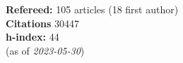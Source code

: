 \textbf{Refereed:} 105 articles (18 first author)\\\textbf{Citations} 30447\\\textbf{h-index:} 44\\(as of \textit{2023-05-30})